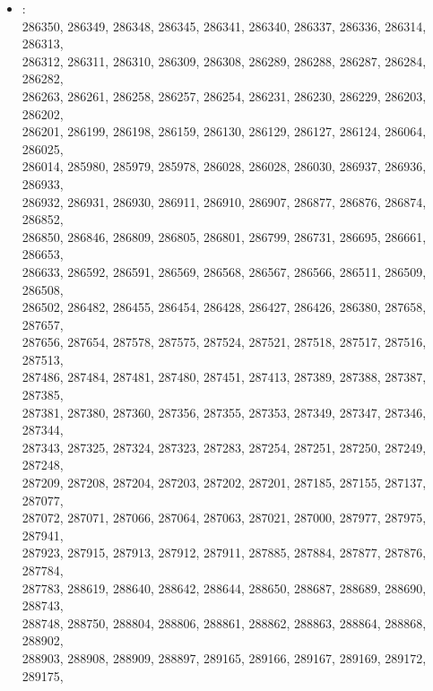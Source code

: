 \begin{appendix}
\vspace{\columnsep}
\begin{itemize}
    \small
    \item[] :\\[5pt]
    \footnotesize
     286350, 286349, 286348, 286345, 286341, 286340, 286337, 286336, 286314, 286313,\\
     286312, 286311, 286310, 286309, 286308, 286289, 286288, 286287, 286284, 286282,\\
     286263, 286261, 286258, 286257, 286254, 286231, 286230, 286229, 286203, 286202,\\
     286201, 286199, 286198, 286159, 286130, 286129, 286127, 286124, 286064, 286025,\\
     286014, 285980, 285979, 285978, 286028, 286028, 286030, 286937, 286936, 286933,\\
     286932, 286931, 286930, 286911, 286910, 286907, 286877, 286876, 286874, 286852,\\
     286850, 286846, 286809, 286805, 286801, 286799, 286731, 286695, 286661, 286653,\\
     286633, 286592, 286591, 286569, 286568, 286567, 286566, 286511, 286509, 286508,\\
     286502, 286482, 286455, 286454, 286428, 286427, 286426, 286380, 287658, 287657,\\
     287656, 287654, 287578, 287575, 287524, 287521, 287518, 287517, 287516, 287513,\\
     287486, 287484, 287481, 287480, 287451, 287413, 287389, 287388, 287387, 287385,\\
     287381, 287380, 287360, 287356, 287355, 287353, 287349, 287347, 287346, 287344,\\
     287343, 287325, 287324, 287323, 287283, 287254, 287251, 287250, 287249, 287248,\\
     287209, 287208, 287204, 287203, 287202, 287201, 287185, 287155, 287137, 287077,\\
     287072, 287071, 287066, 287064, 287063, 287021, 287000, 287977, 287975, 287941,\\
     287923, 287915, 287913, 287912, 287911, 287885, 287884, 287877, 287876, 287784,\\
     287783, 288619, 288640, 288642, 288644, 288650, 288687, 288689, 288690, 288743,\\
     288748, 288750, 288804, 288806, 288861, 288862, 288863, 288864, 288868, 288902,\\
     288903, 288908, 288909, 288897, 289165, 289166, 289167, 289169, 289172, 289175,\\

\end{itemize}
\end{appendix}
